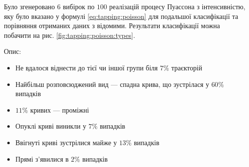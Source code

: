 Було згенеровано $6$ вибірок по $100$ реалізацій процесу Пуассона з
інтенсивністю, яку було вказано у формулі \eqref{eq:tapping:poisson} для
подальшої класифікації та порівняння отриманих даних з відомими.
Результати класифікації можна побачити на рис. \ref{fig:tapping:poisson:types}.

Опис:
\begin{itemize}
  \item
    Не вдалося віднести до тієї чи іншої групи біля $7\%$ траєкторій
  \item
    Найбільш розповсюджений вид --- спадна крива, що зустрілася у $60\%$
    випадків
  \item
    $11\%$ кривих --- проміжні
  \item
    Опуклі криві виникли у $7\%$ випадків
  \item
    Ввігнуті криві зустрілися майже у $13\%$ випадків
  \item
    Прямі з’явилися в $2\%$ випадків
\end{itemize}


